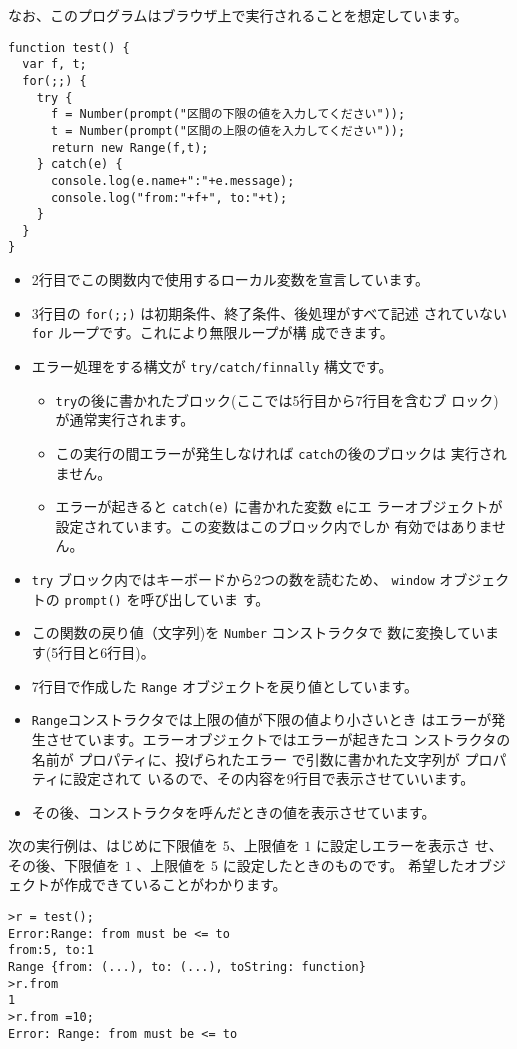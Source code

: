 なお、このプログラムはブラウザ上で実行されることを想定しています。
\begin{Verbatim}[firstnumber=1]
function test() {
  var f, t;
  for(;;) {
    try {
      f = Number(prompt("区間の下限の値を入力してください"));
      t = Number(prompt("区間の上限の値を入力してください"));
      return new Range(f,t);
    } catch(e) {
      console.log(e.name+":"+e.message);
      console.log("from:"+f+", to:"+t);
    }
  }
}
\end{Verbatim}
\begin{itemize}
 \item 2行目でこの関数内で使用するローカル変数を宣言しています。
 \item 3行目の \texttt{for(;;)} は初期条件、終了条件、後処理がすべて記述
       されていない \texttt{for} ループです。これにより無限ループが構
       成できます。
 \item エラー処理をする構文が \texttt{try/catch/finnally} 構文です。
\begin{itemize}
 \item \texttt{try}の後に書かれたブロック(ここでは5行目から7行目を含むブ
       ロック)が通常実行されます。
 \item この実行の間エラーが発生しなければ \texttt{catch}の後のブロックは
       実行されません。
 \item エラーが起きると \texttt{catch(e)} に書かれた変数 \texttt{e}にエ
       ラーオブジェクトが設定されています。この変数はこのブロック内でしか
       有効ではありません。
\end{itemize}
 \item \texttt{try} ブロック内ではキーボードから2つの数を読むため、
       \texttt{window} オブジェクトの \texttt{prompt()} を呼び出していま
       す。
 \item この関数の戻り値（文字列)を \texttt{Number} コンストラクタで
       数に変換しています(5行目と6行目)。
 \item 7行目で作成した \texttt{Range} オブジェクトを戻り値としています。
 \item \texttt{Range}コンストラクタでは上限の値が下限の値より小さいとき
       はエラーが発生させています。エラーオブジェクトではエラーが起きたコ
       ンストラクタの名前が  プロパティに、投げられたエラー
       で引数に書かれた文字列が  プロパティに設定されて
       いるので、その内容を9行目で表示させていいます。
 \item その後、コンストラクタを呼んだときの値を表示させています。
\end{itemize}

次の実行例は、はじめに下限値を $5$、上限値を $1$ に設定しエラーを表示さ
せ、その後、下限値を $1$ 、上限値を $5$ に設定したときのものです。
希望したオブジェクトが作成できていることがわかります。
\begin{Verbatim}
>r = test();
Error:Range: from must be <= to
from:5, to:1
Range {from: (...), to: (...), toString: function}
>r.from
1
>r.from =10;
Error: Range: from must be <= to
\end{Verbatim}